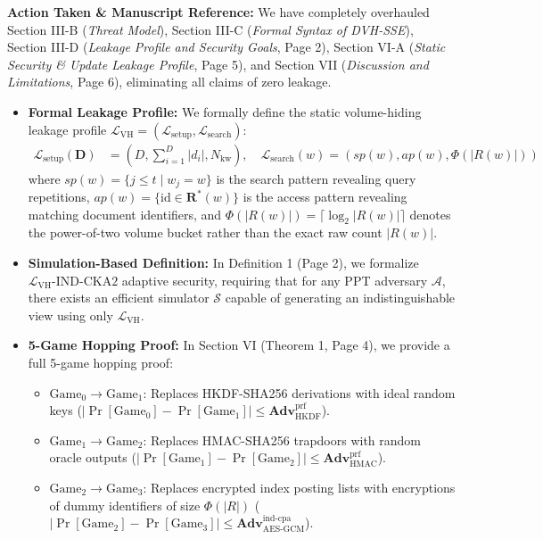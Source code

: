 \documentclass[11pt,a4paper]{article}
\begin{document}
\begin{responsebox}
\textbf{Action Taken \& Manuscript Reference:} We have completely overhauled Section III-B (\emph{Threat Model}), Section III-C (\emph{Formal Syntax of DVH-SSE}), Section III-D (\emph{Leakage Profile and Security Goals}, Page 2), Section VI-A (\emph{Static Security \& Update Leakage Profile}, Page 5), and Section VII (\emph{Discussion and Limitations}, Page 6), eliminating all claims of zero leakage.

\begin{itemize}[itemsep=2pt]
    \item \textbf{Formal Leakage Profile:} We formally define the static volume-hiding leakage profile $\mathcal{L}_{\text{VH}} = (\mathcal{L}_{\text{setup}}, \mathcal{L}_{\text{search}})$:
    \begin{align}
        \mathcal{L}_{\text{setup}}(\mathbf{D}) &= \left( D, \sum_{i=1}^D |d_i|, N_{\text{kw}} \right), \quad
        \mathcal{L}_{\text{search}}(w) = \left( sp(w), ap(w), \Phi(|R(w)|) \right)
    \end{align}
    where $sp(w) = \{j \le t \mid w_j = w\}$ is the search pattern revealing query repetitions, $ap(w) = \{\text{id} \in \mathbf{R}^*(w)\}$ is the access pattern revealing matching document identifiers, and $\Phi(|R(w)|) = \lceil \log_2 |R(w)| \rceil$ denotes the power-of-two volume bucket rather than the exact raw count $|R(w)|$.
    \item \textbf{Simulation-Based Definition:} In Definition 1 (Page 2), we formalize $\mathcal{L}_{\text{VH}}\text{-IND-CKA2}$ adaptive security, requiring that for any PPT adversary $\mathcal{A}$, there exists an efficient simulator $\mathcal{S}$ capable of generating an indistinguishable view using only $\mathcal{L}_{\text{VH}}$.
    \item \textbf{5-Game Hopping Proof:} In Section VI (Theorem 1, Page 4), we provide a full 5-game hopping proof:
    \begin{itemize}[itemsep=1pt]
        \item $\text{Game}_0 \to \text{Game}_1$: Replaces HKDF-SHA256 derivations with ideal random keys ($|\Pr[\text{Game}_0] - \Pr[\text{Game}_1]| \le \mathbf{Adv}_{\text{HKDF}}^{\text{prf}}$).
        \item $\text{Game}_1 \to \text{Game}_2$: Replaces HMAC-SHA256 trapdoors with random oracle outputs ($|\Pr[\text{Game}_1] - \Pr[\text{Game}_2]| \le \mathbf{Adv}_{\text{HMAC}}^{\text{prf}}$).
        \item $\text{Game}_2 \to \text{Game}_3$: Replaces encrypted index posting lists with encryptions of dummy identifiers of size $\Phi(|R|)$ ($|\Pr[\text{Game}_2] - \Pr[\text{Game}_3]| \le \mathbf{Adv}_{\text{AES-GCM}}^{\text{ind-cpa}}$).

\end{itemize}
\end{itemize}
\end{responsebox}
\end{document}
